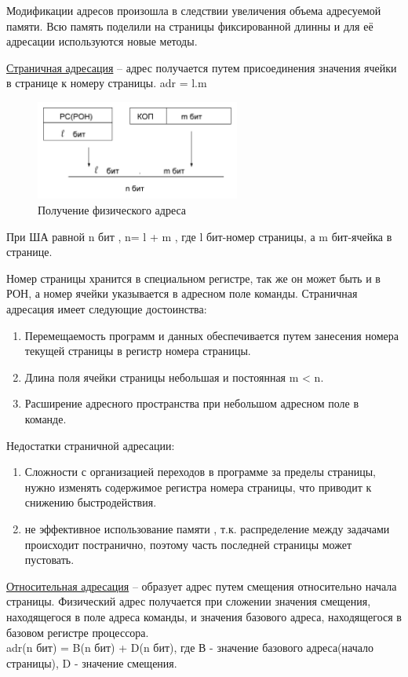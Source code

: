 \documentclass[unicode, 12pt, a4paper, oneside]{article}
\begin{document}
Модификации адресов произошла в следствии увеличения объема адресуемой памяти. Всю память поделили на страницы фиксированной длинны и для её адресации используются новые методы.

\underline{Страничная адресация} -- адрес получается путем присоединения значения ячейки в странице к номеру страницы. adr = l.m\\
\begin{figure}[H]
\centering
\includegraphics[width=0.6\textwidth]{111_Stranichna.JPG}
\caption{Получение физического адреса}
\end{figure}
При ША равной n бит , n= l + m , где l бит-номер страницы, а m бит-ячейка в странице.

Номер страницы хранится в специальном регистре, так же он может быть и в РОН, а номер ячейки указывается в адресном поле команды.
Страничная адресация имеет следующие достоинства:
\begin{enumerate}
\item Перемещаемость программ и данных обеспечивается путем занесения номера текущей страницы в регистр номера страницы.
\item Длина поля ячейки страницы небольшая и постоянная m < n.
\item Расширение адресного пространства при небольшом адресном поле в команде.
\end{enumerate}
Недостатки страничной адресации:
\begin{enumerate}
\item Сложности с организацией переходов в программе за пределы страницы, нужно изменять содержимое регистра номера страницы, что приводит к снижению быстродействия.
\item не эффективное использование памяти , т.к. распределение между задачами происходит постранично, поэтому часть последней страницы может пустовать. 
\end{enumerate}

\underline{Относительная адресация} -- образует адрес путем смещения относительно начала страницы. Физический адрес получается при сложении значения  смещения, находящегося в поле адреса команды, и значения базового  адреса, находящегося в базовом регистре процессора.\\
adr(n бит) = B(n бит) + D(n бит), где В - значение базового адреса(начало страницы), D - значение смещения.
\end{document}
